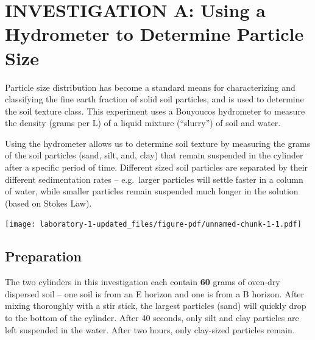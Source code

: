 \documentclass[
  letterpaper,
  twocolumn,
  portrait]{scrbook}
\begin{document}
\hypertarget{investigation-a-using-a-hydrometer-to-determine-particle-size}{%
\section{INVESTIGATION A: Using a Hydrometer to Determine Particle
Size}\label{investigation-a-using-a-hydrometer-to-determine-particle-size}}

Particle size distribution has become a standard means for
characterizing and classifying the fine earth fraction of solid soil
particles, and is used to determine the soil texture class. This
experiment uses a Bouyoucos hydrometer to measure the density (grams per
L) of a liquid mixture (``slurry'') of soil and water.

Using the hydrometer allows us to determine soil texture by measuring
the grams of the soil particles (sand, silt, and, clay) that remain
suspended in the cylinder after a specific period of time. Different
sized soil particles are separated by their different sedimentation
rates -- e.g.~larger particles will settle faster in a column of water,
while smaller particles remain suspended much longer in the solution
(based on Stokes Law).

\begin{tcolorbox}[enhanced jigsaw, colframe=quarto-callout-note-color-frame, coltitle=black, arc=.35mm, breakable, bottomrule=.15mm, colback=white, rightrule=.15mm, toprule=.15mm, opacityback=0, bottomtitle=1mm, left=2mm, titlerule=0mm, leftrule=.75mm, opacitybacktitle=0.6, toptitle=1mm, title=\textcolor{quarto-callout-note-color}{\faInfo}\hspace{0.5em}{Watch this video before you start Investigation A}, colbacktitle=quarto-callout-note-color!10!white]

\texttt{[image: laboratory-1-updated\_files/figure-pdf/unnamed-chunk-1-1.pdf]}

\end{tcolorbox}

\hypertarget{preparation}{%
\subsection{Preparation}\label{preparation}}

The two cylinders in this investigation each contain \textbf{60} grams
of oven-dry dispersed soil -- one soil is from an E horizon and one is
from a B horizon. After mixing thoroughly with a stir stick, the largest
particles (sand) will quickly drop to the bottom of the cylinder. After
40 seconds, only silt and clay particles are left suspended in the
water. After two hours, only clay-sized particles remain.
\end{document}
